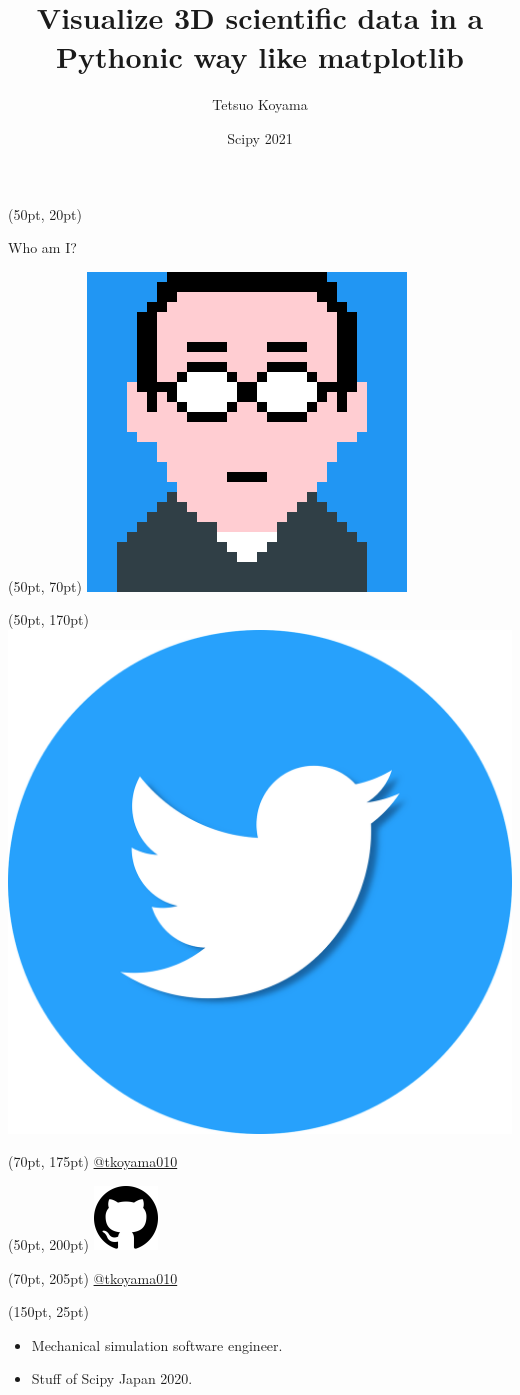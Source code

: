 \documentclass[aspectratio=169,12pt]{beamer}
\title{Visualize 3D scientific data in a Pythonic way like matplotlib}
\begin{document}
\author{Tetsuo Koyama}
\date{Scipy 2021}

\frame{\titlepage}

\begin{frame}[fragile]
\begin{textblock*}{350pt}(50pt, 20pt)
\begin{block}{Who am I?}
\end{block}
\end{textblock*}
\begin{textblock*}{350pt}(50pt, 70pt)
\includegraphics[width=0.25\linewidth]{tkoyama010.png}
\end{textblock*}
\begin{textblock*}{350pt}(50pt, 170pt)
\includegraphics[width=0.05\linewidth]{twitter-5662063_1280.png}
\end{textblock*}
\begin{textblock*}{350pt}(70pt, 175pt)
\href{https://twitter.com/tkoyama010}{@tkoyama010}
\end{textblock*}
\begin{textblock*}{350pt}(50pt, 200pt)
\includegraphics[width=0.05\linewidth]{github.png}
\end{textblock*}
\begin{textblock*}{350pt}(70pt, 205pt)
\href{https://github.com/tkoyama010}{@tkoyama010}
\end{textblock*}
\begin{textblock*}{350pt}(150pt, 25pt)
\begin{itemize}
\item Mechanical simulation software engineer.
\item Stuff of Scipy Japan 2020.

\end{itemize}
\end{textblock*}
\end{frame}
\end{document}
